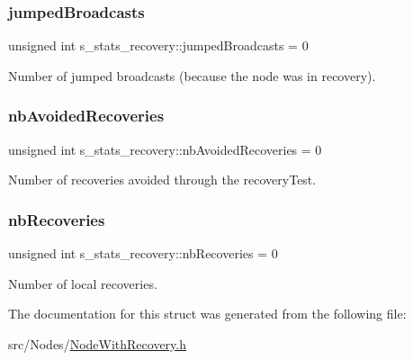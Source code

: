 \subsubsection{\texorpdfstring{jumped\+Broadcasts}{jumpedBroadcasts}}
{\footnotesize\ttfamily unsigned int s\+\_\+stats\+\_\+recovery\+::jumped\+Broadcasts = 0}



Number of jumped broadcasts (because the node was in recovery). 

\mbox{\label{structs__stats__recovery_a0f21481940b624e49b0880d1bbf3df33}} 
\subsubsection{\texorpdfstring{nb\+Avoided\+Recoveries}{nbAvoidedRecoveries}}
{\footnotesize\ttfamily unsigned int s\+\_\+stats\+\_\+recovery\+::nb\+Avoided\+Recoveries = 0}



Number of recoveries avoided through the recovery\+Test. 

\mbox{\label{structs__stats__recovery_a89b2e116cf913c2939d186a2cd4f865b}} 
\subsubsection{\texorpdfstring{nb\+Recoveries}{nbRecoveries}}
{\footnotesize\ttfamily unsigned int s\+\_\+stats\+\_\+recovery\+::nb\+Recoveries = 0}



Number of local recoveries. 



The documentation for this struct was generated from the following file\+:\begin{DoxyCompactItemize}
\item 
src/\+Nodes/\hyperlink{_node_with_recovery_8h}{Node\+With\+Recovery.\+h}\end{DoxyCompactItemize}
